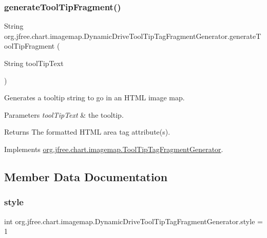 \subsubsection{\texorpdfstring{generate\+Tool\+Tip\+Fragment()}{generateToolTipFragment()}}
{\footnotesize\ttfamily String org.\+jfree.\+chart.\+imagemap.\+Dynamic\+Drive\+Tool\+Tip\+Tag\+Fragment\+Generator.\+generate\+Tool\+Tip\+Fragment (\begin{DoxyParamCaption}\item[{String}]{tool\+Tip\+Text }\end{DoxyParamCaption})}

Generates a tooltip string to go in an H\+T\+ML image map.


\begin{DoxyParams}{Parameters}
{\em tool\+Tip\+Text} & the tooltip.\\
\hline
\end{DoxyParams}
\begin{DoxyReturn}{Returns}
The formatted H\+T\+ML area tag attribute(s). 
\end{DoxyReturn}


Implements \mbox{\hyperlink{interfaceorg_1_1jfree_1_1chart_1_1imagemap_1_1_tool_tip_tag_fragment_generator_a4e96c861b1fa7000056ed50c9ade7484}{org.\+jfree.\+chart.\+imagemap.\+Tool\+Tip\+Tag\+Fragment\+Generator}}.



\subsection{Member Data Documentation}
\mbox{\label{classorg_1_1jfree_1_1chart_1_1imagemap_1_1_dynamic_drive_tool_tip_tag_fragment_generator_ab59865f9d9c46d5e4b171ed26e640457}} 
\subsubsection{\texorpdfstring{style}{style}}
{\footnotesize\ttfamily int org.\+jfree.\+chart.\+imagemap.\+Dynamic\+Drive\+Tool\+Tip\+Tag\+Fragment\+Generator.\+style = 1\hspace{0.3cm}{\ttfamily [protected]}}

